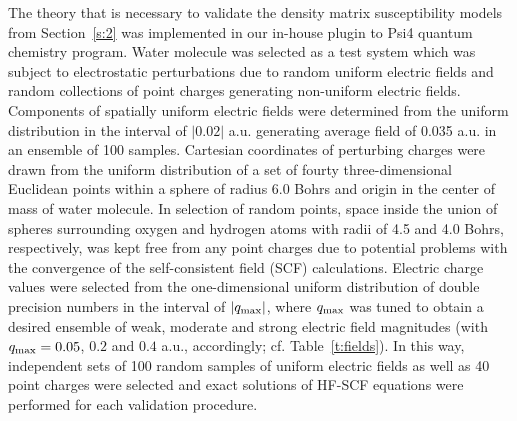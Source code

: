 \documentclass[aip,amsmath,amssymb,reprint,floatfix]{revtex4-1}
\begin{document}
The theory that is necessary to validate the density matrix susceptibility models from Section~\ref{s:2}
was implemented in our in\hyp{}house plugin to {\sc Psi4} quantum chemistry program.\cite{Psi4.JCTC.2017}
Water molecule
was selected as a test system which was subject to 
electrostatic perturbations due to random uniform electric fields and random collections of point charges
generating non\hyp{}uniform electric fields. 
Components of spatially uniform electric fields were determined 
from the uniform distribution in the interval of $\vert 0.02 \vert$ a.u.
generating average field of 0.035 a.u. in an ensemble of 100 samples.
Cartesian coordinates of perturbing charges were drawn from the uniform distribution of a set of fourty
three\hyp{}dimensional Euclidean points within a sphere of radius 6.0 Bohrs
and origin in the center of mass of water molecule.
In selection of random points, space inside the union of spheres surrounding
oxygen and hydrogen atoms with radii of 4.5 and 4.0 Bohrs, respectively, was
kept free from any point charges due to potential problems with the convergence of the 
self\hyp{}consistent field (SCF) calculations.
Electric charge values were selected from the one\hyp{}dimensional uniform distribution
of double precision numbers in the interval of $\vert q_{\rm max} \vert$, where $q_{\rm max}$
was tuned to obtain a desired ensemble of weak, moderate and strong electric field magnitudes
(with $q_{\rm max}=0.05$, $0.2$ and $0.4$ a.u., accordingly; cf. Table~\ref{t:fields}).
In this way, independent sets of 100 random samples of uniform electric fields as well as 
40 point charges were selected and exact solutions of HF\hyp{}SCF equations were 
performed for each validation procedure.
\end{document}
